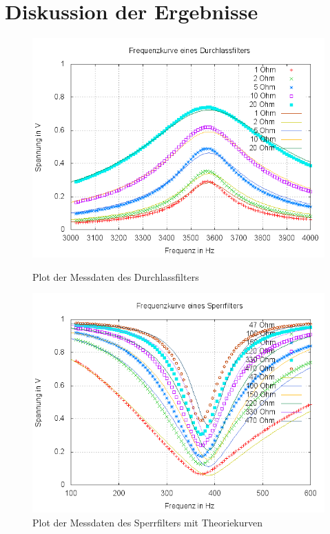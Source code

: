 \section{Diskussion der Ergebnisse}
\begin{figure}
	\includegraphics[width=.9\textwidth]{images/durchlassfilter+theorie+R_ges-fit}
\caption{Plot der Messdaten des Durchlassfilters}
\label{plot:durchlass+R_ges-fit}

	\includegraphics[width=.9\textwidth]{images/plot-sperrfilter+theorie+R_L}
\caption{Plot der Messdaten des Sperrfilters mit Theoriekurven}
\label{plot:sperr}
\end{figure}